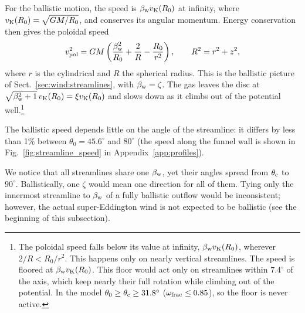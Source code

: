 For the ballistic motion, the speed  is $\beta_{\rm w}v_{\rm K}(R_0)$ at infinity, where $v_{\rm K}(R_0) = \sqrt{GM/R_0}$, and conserves its angular momentum.
Energy conservation then gives the poloidal speed
\begin{equation}
v_{\rm pol}^2 = GM\left(\frac{\beta_{\rm w}^2}{R_0} + \frac{2}{R} - \frac{R_0}{r^2}\right), \qquad R^2 = r^2 + z^2 ,
\label{eq:vballistic}
\end{equation}
where $r$ is the cylindrical and $R$ the spherical radius.
This is the ballistic picture of Sect.~\ref{sec:wind:streamlines}, with $\beta_{\rm w} = \zeta$.
The gas leaves the disc at $\sqrt{\beta_{\rm w}^2 + 1}\,v_{\rm K}(R_0) = \xi v_{\rm K}(R_0)$ and slows down as it climbs out of the potential well.\footnote{The poloidal speed falls below its value at infinity, $\beta_{\rm w}v_{\rm K}(R_0)$, wherever $2/R < R_0/r^2$.
This happens only on nearly vertical streamlines.
The speed is floored at $\beta_{\rm w}v_{\rm K}(R_0)$.
This floor would act only on streamlines within $7.4^\circ$ of the axis, which keep nearly their full rotation while climbing out of the potential.
In the model $\theta_0 \ge \theta_{\rm c} \ge 31.8^\circ$ ($\omega_{\rm frac} \le 0.85$), so the floor is never active.}

The ballistic speed depends little on the angle of the streamline: it differs by less than 1\% between $\theta_0 = 45.6^\circ$ and $80^\circ$ (the speed along the funnel wall is shown in Fig.~\ref{fig:streamline_speed} in Appendix~\ref{app:profiles}).

We notice that all streamlines share one $\beta_{\rm w}$, yet their angles spread from $\theta_{\rm c}$ to $90^\circ$.
Ballistically, one $\zeta$ would mean one direction for all of them.
Tying only the innermost streamline to $\beta_{\rm w}$ of a fully ballistic outflow would be inconsistent; however, the actual super-Eddington wind is not expected to be ballistic (see the beginning of this subsection).

